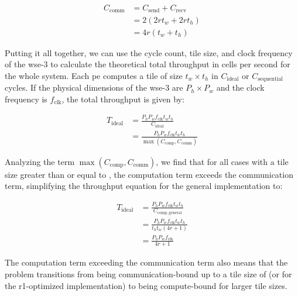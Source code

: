 \begin{equation}
    \label{eq:c_comm}
    \begin{aligned}
        C_{\mathrm{comm}} &= C_{\mathrm{send}} + C_{\mathrm{recv}} \\[1ex]
        &= 2\left(2 r t_w + 2 r t_h\right) \\[1ex]
        &= 4r\left(t_w+t_h\right)
    \end{aligned}
\end{equation}

Putting it all together, we can use the cycle count, tile size, and clock frequency of the \ac{wse}-3 to calculate the theoretical total throughput in cells per second for the whole system. Each \ac{pe} computes a tile of size $t_w \times t_h$ in $C_{\mathrm{ideal}}$ or $C_{\mathrm{sequential}}$ cycles. If the physical dimensions of the \ac{wse}-3 are $P_h \times P_w$ and the clock frequency is $f_{\mathrm{clk}}$, the total throughput is given by:

\begin{equation}
    \label{eq:throughput_ideal}
    \begin{aligned}
        T_{\mathrm{ideal}} &= \frac{P_h P_w f_{\mathrm{clk}} t_w t_h}{C_{\mathrm{ideal}}} \\[1ex]
        &= \frac{P_h P_w f_{\mathrm{clk}} t_w t_h}{\max\left(C_{\mathrm{comp}}, C_{\mathrm{comm}}\right)}
    \end{aligned}
\end{equation}

Analyzing the term $\max\left(C_{\mathrm{comp}}, C_{\mathrm{comm}}\right)$, we find that for all cases with a tile size greater than or equal to , the computation term exceeds the communication term, simplifying the throughput equation for the general implementation to:

\begin{equation}
    \label{eq:throughput_ideal_simplified}
    \begin{aligned}
        T_{\mathrm{ideal}} &= \frac{P_h P_w f_{\mathrm{clk}} t_w t_h}{C_{\mathrm{comp,general}}} \\[1ex]
        &= \frac{P_h P_w f_{\mathrm{clk}} t_w t_h}{t_h t_w \left(4r + 1\right)} \\[1ex]
        &= \frac{P_h P_w f_{\mathrm{clk}}}{4r + 1}
    \end{aligned}
\end{equation}

The computation term exceeding the communication term also means that the problem transitions from being communication-bound up to a tile size of  (or  for the r1-optimized implementation) to being compute-bound for larger tile sizes.

